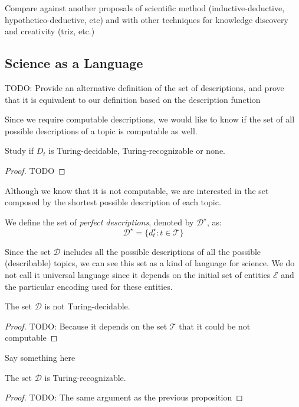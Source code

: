{\color{red} Compare against another proposals of scientific method (inductive-deductive, hypothetico-deductive, etc) and with other techniques for knowledge discovery and creativity (triz, etc.)}

\subsection{Science as a Language}

{\color{red} TODO: Provide an alternative definition of the set of descriptions, and prove that it is equivalent to our definition based on the description function}

Since we require computable descriptions, we would like to know if the set of all possible descriptions of a topic is computable as well.

\begin{proposition}
Study if $D_{t}$ is Turing-decidable, Turing-recognizable or none.
\end{proposition}
\begin{proof}
{\color{red} TODO}
\end{proof}

Although we know that it is not computable, we are interested in the set composed by the shortest possible description of each topic.

\begin{definition}
We define the set of \emph{perfect descriptions}, denoted by $\mathcal{D}^\star$, as:
\[
\mathcal{D}^\star = \{ d_t^\star : t \in \mathcal{T} \}
\]
\end{definition}

Since the set $\mathcal{D}$ includes all the possible descriptions of all the possible (describable) topics, we can see this set as a kind of language for science. We do not call it universal language since it depends on the initial set of entities $\mathcal{E}$ and the particular encoding used for these entities.

\begin{proposition}
The set $\mathcal{D}$ is not Turing-decidable.
\end{proposition}
\begin{proof}
{\color{red} TODO: Because it depends on the set $\mathcal{T}$ that it could be not computable}
\end{proof}

Say something here

\begin{proposition}
The set $\mathcal{D}$ is Turing-recognizable.
\end{proposition}
\begin{proof}
{\color{red} TODO: The same argument as the previous proposition}
\end{proof}

